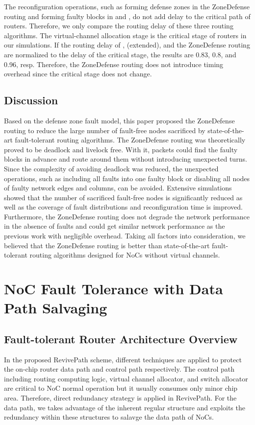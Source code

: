 The reconfiguration operations, such as forming defense zones in the ZoneDefense routing and forming faulty blocks in \cite{wu2003fault} and \cite{zhang2008reconfigurable}, do not add delay to the critical path of routers. Therefore, we only compare the routing delay of these three routing algorithms. The virtual-channel allocation stage is the critical stage of routers in our simulations. If the routing delay of \cite{wu2003fault}, \cite{zhang2008reconfigurable} (extended), and the ZoneDefense routing are normalized to the delay of the critical stage, the results are 0.83, 0.8, and 0.96, resp. Therefore, the ZoneDefense routing does not introduce timing overhead since the critical stage does not change.

\subsection{Discussion}
Based on the defense zone fault model, this paper proposed the ZoneDefense routing to reduce the large number of fault-free nodes sacrificed by state-of-the-art fault-tolerant routing algorithms. The ZoneDefense routing was theoretically proved to be deadlock and livelock free. With it, packets could find the faulty blocks in advance and route around them without introducing unexpected turns. Since the complexity of avoiding deadlock was reduced, the unexpected operations, such as including all faults into one faulty block or disabling all nodes of faulty network edges and columns, can be avoided. Extensive simulations showed that the number of sacrificed fault-free nodes is significantly reduced as well as the coverage of fault distributions and reconfiguration time is improved. Furthermore, the ZoneDefense routing does not degrade the network performance in the absence of faults and could get similar network performance as the previous work with negligible overhead. Taking all factors into consideration, we believed that the ZoneDefense routing is better than state-of-the-art fault-tolerant routing algorithms designed for NoCs without virtual channels.

\section{NoC Fault Tolerance with Data Path Salvaging}

\subsection{Fault-tolerant Router Architecture Overview}
In the proposed RevivePath scheme, different techniques are applied to protect the on-chip router data path and control path respectively. The control path including routing computing logic, virtual channel allocator, and switch allocator are critical to NoC normal operation but it usually consumes only minor chip area. Therefore, direct redundancy strategy is applied in RevivePath. For the data path, we takes advantage of the inherent regular structure and exploits the redundancy within these structures to salavge the data path of NoCs.

